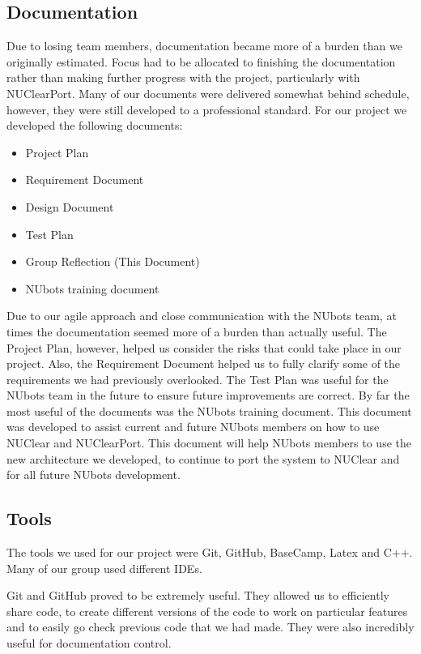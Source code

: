 \documentclass[english,12pt]{scrartcl}
\begin{document}
	\subsection{Documentation}
		Due to losing team members, documentation became more of a burden than we originally estimated.
		Focus had to be allocated to finishing the documentation rather than making further progress with the project, particularly with NUClearPort.
		Many of our documents were delivered somewhat behind schedule, however, they were still developed to a professional standard.
		For our project we developed the following documents:
		\begin{itemize}
			\item Project Plan
			\item Requirement Document
			\item Design Document
			\item Test Plan
			\item Group Reflection (This Document)
			\item NUbots training document
		\end{itemize}

		Due to our agile approach and close communication with the NUbots team, at times the documentation seemed more of a burden than actually useful.
		The Project Plan, however, helped us consider the risks that could take place in our project.
		Also, the Requirement Document helped us to fully clarify some of the requirements we had previously overlooked.
		The Test Plan was useful for the NUbots team in the future to ensure future improvements are correct.
		By far the most useful of the documents was the NUbots training document.
		This document was developed to assist current and future NUbots members on how to use NUClear and NUClearPort.
		This document will help NUbots members to use the new architecture we developed, to continue to port the system to NUClear and for all future NUbots development.

	\subsection{Tools}
		The tools we used for our project were Git, GitHub, BaseCamp, Latex and C++.
		Many of our group used different IDEs.

		Git and GitHub proved to be extremely useful.
		They allowed us to efficiently share code, to create different versions of the code to work on particular features and to easily go check previous code that we had made. They were also incredibly useful for documentation control.
\end{document}
